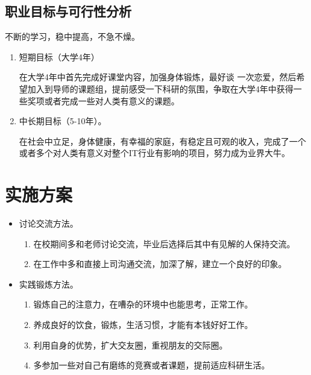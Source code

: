 \documentclass{article}
\begin{document}
\subsection{职业目标与可行性分析}
\par
不断的学习，稳中提高，不急不燥。\par 
\begin{enumerate}[(1)]
	\item 短期目标（大学4年）\par 
	在大学4年中首先完成好课堂内容，加强身体锻炼，最好谈 一次恋爱，然后希望加入到导师的课题组，提前感受一下科研的氛围，争取在大学4年中获得一些奖项或者完成一些对人类有意义的课题。\par
	\item 中长期目标（5-10年）。\par
	在社会中立足，身体健康，有幸福的家庭，有稳定且可观的收入，完成了一个或者多个对人类有意义对整个IT行业有影响的项目，努力成为业界大牛。\par
\end{enumerate}



\section{实施方案}
\begin{itemize}
    \item 讨论交流方法。\par
   \begin{enumerate}[1、]
	\item 在校期间多和老师讨论交流，毕业后选择后其中有见解的人保持交流。
	\item 在工作中多和直接上司沟通交流，加深了解，建立一个良好的印象。

\end{enumerate}
    \item 实践锻炼方法。\par
  
\begin{enumerate}[1、]
	\item 锻炼自己的注意力，在嘈杂的环境中也能思考，正常工作。
	\item 养成良好的饮食，锻炼，生活习惯，才能有本钱好好工作。
	\item 利用自身的优势，扩大交友圈，重视朋友的交际圈。
	\item 多参加一些对自己有磨练的竞赛或者课题，提前适应科研生活。
\end{enumerate}
\end{itemize}
\par 
\end{document}
